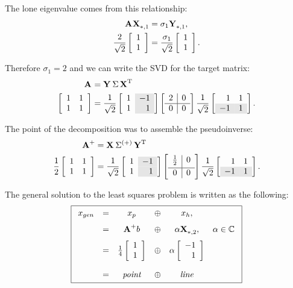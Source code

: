 The lone eigenvalue comes from this relationship:
\begin{equation}
  \begin{split}
    \A{} \X{}_{*,1} &= \sigma_{1} \Y{}_{*,1},\\
    \frac{2}{\sqrt{2}}
    \mat{c}{1\\1} &= \frac{\sigma_{1}}{\sqrt{2}}
    \mat{c}{1\\1}.
  \end{split}
\end{equation}

Therefore $\sigma_{1} = 2$ and we can write the SVD for the target matrix:
\begin{equation}
  \begin{split}
     \svda{T}\\
     \mat{cc}{1&1\\1&1} &= 
     \stwo
\left[
\begin{array}{r >{\columncolor{ltgray}}r}
  1 & -1 \\
  1 &  1
\end{array}
\right]
     \mat{c|c}{2&0\\\hline 0&0}
     \stwo \mat{rr}{1&1\\\rowcolor{ltgray}-1&1}.
  \end{split}
\end{equation}

The point of the decomposition was to assemble the pseudoinverse:
\begin{equation}
  \begin{split}
     \mpgia{T}\\
      \rtwo \mat{cc}{1&1\\1&1} &= 
\stwo
\left[
\begin{array}{r >{\columncolor{ltgray}}r}
  1 & -1 \\
  1 &  1
\end{array}
\right]
     \mat{c|c}{\frac{1}{2}&0\\[3pt]\hline 0&0}
     \stwo \mat{rr}{1&1\\\rowcolor{ltgray}-1&1}.
  \end{split}
\end{equation}

The general solution to the least squares problem is written as the following:
\begin{equation}
\boxed{
  \begin{array}{rccccc}
    x_{gen} &=& x_{p} &\oplus& x_{h},\\[7pt]
      &=& \A{+}b &\oplus& \alpha \X{}_{*,2}, & \alpha\in\cmplx{}\\[7pt]
      &=& \frac{1}{4}\mat{r}{1\\1} &\oplus& \alpha \mat{r}{-1\\1}\\[17pt]
      &=& \textit{point} &\oplus& \textit{line}
  \end{array}
}
\label{eq:simple:fullsoln}
\end{equation}

